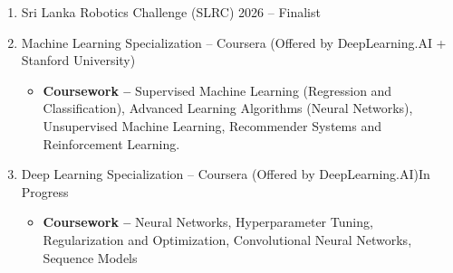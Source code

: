 \documentclass[10pt,a4paper]{article}
\begin{document}
\begin{enumerate}[leftmargin=*]
    \item Sri Lanka Robotics Challenge (SLRC) 2026 -- Finalist

    \vspace{0.2cm}
    \item Machine Learning Specialization -- Coursera (Offered by DeepLearning.AI + Stanford University)

    \begin{itemize}
        \item \textbf{Coursework --} Supervised Machine Learning (Regression and Classification), Advanced Learning Algorithms (Neural Networks), Unsupervised Machine Learning, Recommender Systems and Reinforcement Learning.
    \end{itemize}




\vspace{0.2cm}

    \item Deep Learning Specialization -- Coursera  (Offered by DeepLearning.AI)\hfill In Progress

     \begin{itemize}
        \item \textbf{Coursework --} Neural Networks, Hyperparameter Tuning, Regularization and Optimization, Convolutional Neural Networks, Sequence Models
    \end{itemize}




  
\end{enumerate}
\end{document}
